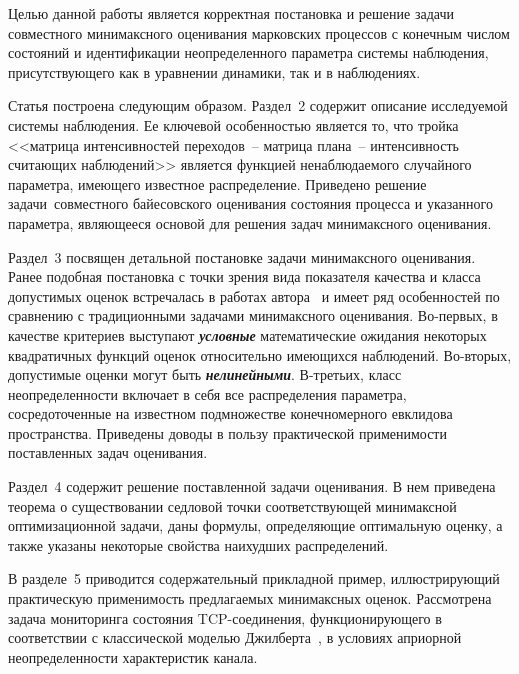 \begin{multicols}{2}
 Целью данной работы является корректная постанов\-ка и решение задачи
 совместного мини\-макс\-ного оценивания марковских процессов с конеч\-ным
 числом состояний и идентификации неопределенного параметра системы наблюдения, присутствующего
 как в уравнении динамики, так и в наблюдениях.

 Статья построена следующим образом. Раздел~2 содержит описание исследуемой
 системы наблюдения. Ее ключевой особенностью является то, что тройка
 <<матрица интенсивностей переходов~--\linebreak
 матрица плана~-- интенсивность считающих наблюдений>> является функцией ненаблюдаемого\linebreak
 случайного параметра, имеющего известное распределение. 
Приведено решение задачи~со\-вмест\-ного байесовского оценивания состояния процесса и указанного
 параметра, являющееся основой для решения задач минимаксного оценивания.
{

}

 Раздел~3 посвящен детальной постановке задачи\linebreak
 минимаксного оценивания. Ранее подобная постановка
 с точки зрения вида показателя качества и класса допустимых оценок
 встречалась в работах автора~\cite{bor_2007_2, bor_2007} и имеет ряд особенностей по сравнению с
 традиционными задачами минимаксного оценивания.
 Во-первых, в качестве критериев выступают {\bfseries\textit{условные}}
 математические ожидания некоторых квадратичных функций оценок
 относительно имеющихся наблюдений. Во-вторых, допустимые оценки
 могут быть {\bfseries\textit{нелинейными}}. В-третьих, класс неопределенности
 включает в себя все распределения параметра, сосредоточенные на известном подмножестве конечномерного
 евклидова пространства. Приведены доводы в пользу практической применимости
 поставленных задач оценивания.
 {
 
 }

 Раздел~4 содержит решение поставленной задачи оценивания. В нем
 приведена теорема о существовании седловой точки соответствующей
 минимаксной оптимизационной задачи, даны формулы, определяющие
 оптимальную оценку, а также указаны некоторые свойства наихудших
 распределений.

 В разделе~5 приводится содержательный прикладной пример,
 иллюстрирующий практическую применимость предлагаемых минимаксных
 оценок. Рассмотрена задача мониторинга состояния TCP-соединения,
 функционирующего в соответствии с классической моделью Джилберта~\cite{gilb},
 в условиях априорной неопределенности характеристик
 канала.


\end{multicols}

